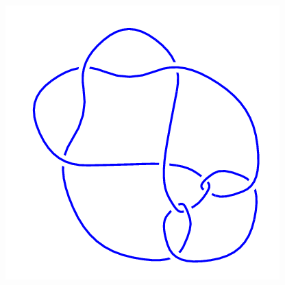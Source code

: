 \begin{figure}[H]
\begin{minipage}[b]{.18\linewidth}
	\end{minipage}
	\begin{minipage}[b]{.18\linewidth}
		\centering
		\includegraphics[width=\linewidth]{../data/10_141.png}
	\end{minipage}
\end{figure}
